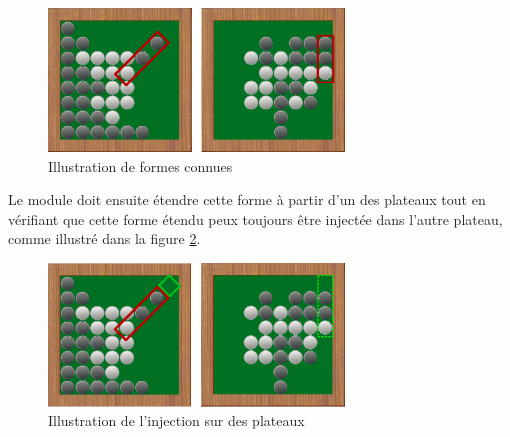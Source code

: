 \begin{figure}[H] 
\begin{center}
\includegraphics[width=0.7\textwidth]{files/raisonneur/cbs_reco1} 
\end{center}
\caption{Illustration de formes connues} 
\label{img_cbs_reco1}
\end{figure}

Le module doit ensuite étendre cette forme à partir d'un des plateaux tout en vérifiant que cette forme étendu peux toujours être injectée dans l'autre plateau, comme illustré dans la figure \ref{img_cbs_reco_forme_injection}.

\begin{figure}[H] 
\begin{center}
\includegraphics[width=0.7\textwidth]{files/raisonneur/cbs_reco3} 
\end{center}
\caption{Illustration de l'injection sur des plateaux} 
\label{img_cbs_reco_forme_injection}
\end{figure}